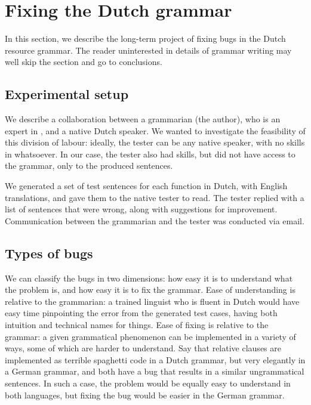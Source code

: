 \section{Fixing the Dutch grammar}
\label{dutch-experiment}

In this section, we describe the long-term project of fixing bugs in
the Dutch resource grammar. The reader uninterested in details of
grammar writing may well skip the section and go to conclusions.


\subsection{Experimental setup}\label{experimental-setup}

We describe a collaboration between a grammarian (the author), who is an
expert in \gf, and a native Dutch speaker. We wanted to investigate the
feasibility of this division of labour: ideally, the tester can be any
native speaker, with no skills in \gf{} whatsoever. In our case, the tester
also had \gf{} skills, but did not have access to the grammar, only to the
produced sentences.

We generated a set of test sentences for each function in Dutch, with
English translations, and gave them to the native tester to read. The
tester replied with a list of sentences that were wrong, along with
suggestions for improvement. Communication between the grammarian and
the tester was conducted via email.

\subsection{Types of bugs}\label{types-of-bugs}

We can classify the bugs in two dimensions: how easy it is to understand
what the problem is, and how easy it is to fix the grammar. Ease of
understanding is relative to the grammarian: a trained linguist who is
fluent in Dutch would have easy time pinpointing the error from the
generated test cases, having both intuition and technical names for
things. Ease of fixing is relative to the grammar: a given grammatical
phenomenon can be implemented in a variety of ways, some of which are
harder to understand. Say that relative clauses are implemented as
terrible spaghetti code in a Dutch grammar, but very elegantly in a
German grammar, and both have a bug that results in a similar
ungrammatical sentences. In such a case, the problem would be equally
easy to understand in both languages, but fixing the bug would be easier
in the German grammar.

